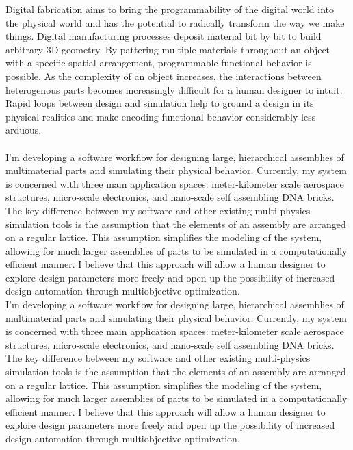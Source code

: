 % 
% 
%
Digital fabrication aims to bring the programmability of the digital world into the physical world and has the potential to radically transform the way we make things.  Digital manufacturing processes deposit material bit by bit to build arbitrary 3D geometry.  By pattering multiple materials throughout an object with a specific spatial arrangement, programmable functional behavior is possible.  As the complexity of an object increases, the interactions between heterogenous parts becomes increasingly difficult for a human designer to intuit.  Rapid loops between design and simulation help to ground a design in its physical realities and make encoding functional behavior considerably less arduous.\\
\\
I'm developing a software workflow for designing large, hierarchical assemblies of multimaterial parts and simulating their physical behavior.  Currently, my system is concerned with three main application spaces: meter-kilometer scale aerospace structures, micro-scale electronics, and nano-scale self assembling DNA bricks.  The key difference between my software and other existing multi-physics simulation tools is the assumption that the elements of an assembly are arranged on a regular lattice.  This assumption simplifies the modeling of the system, allowing for much larger assemblies of parts to be simulated in a computationally efficient manner.  I believe that this approach will allow a human designer to explore design parameters more freely and open up the possibility of increased design automation through multiobjective optimization.
\\
I'm developing a software workflow for designing large, hierarchical assemblies of multimaterial parts and simulating their physical behavior.  Currently, my system is concerned with three main application spaces: meter-kilometer scale aerospace structures, micro-scale electronics, and nano-scale self assembling DNA bricks.  The key difference between my software and other existing multi-physics simulation tools is the assumption that the elements of an assembly are arranged on a regular lattice.  This assumption simplifies the modeling of the system, allowing for much larger assemblies of parts to be simulated in a computationally efficient manner.  I believe that this approach will allow a human designer to explore design parameters more freely and open up the possibility of increased design automation through multiobjective optimization.